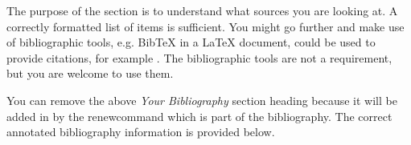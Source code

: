 \documentclass[11pt,fleqn,twoside]{article}
\begin{document}
The purpose of the section is to understand what sources you are looking at.  A correctly formatted list of items is sufficient. You might go further and make use of bibliographic tools, e.g. BibTeX in a LaTeX document, could be used to provide citations, for example \cite{NumericalRecipes} \cite{MarksPaper} \cite[99-101]{FailBlog} \cite{kittenpic_ref}.  The bibliographic tools are not a requirement, but you are welcome to use them.   

You can remove the above {\em Your Bibliography} section heading because it will be added in by the renewcommand which is part of the bibliography. The correct annotated bibliography information is provided below. 
%
%


\nocite{*} %

\newpage
{} 

%
%

\renewcommand{\refname}{Annotated Bibliography}  %
\end{document}
